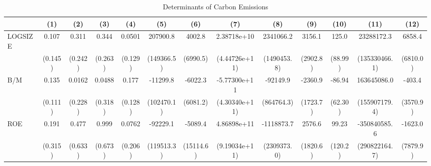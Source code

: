 \begin{table}[htbp]\centering
\def\sym#1{\ifmmode^{#1}\else\(^{#1}\)\fi}
\caption{Determinants of Carbon Emissions}
\begin{tabular}{l*{12}{c}}
\hline\hline
                    &\multicolumn{1}{c}{(1)}         &\multicolumn{1}{c}{(2)}         &\multicolumn{1}{c}{(3)}         &\multicolumn{1}{c}{(4)}         &\multicolumn{1}{c}{(5)}         &\multicolumn{1}{c}{(6)}         &\multicolumn{1}{c}{(7)}         &\multicolumn{1}{c}{(8)}         &\multicolumn{1}{c}{(9)}         &\multicolumn{1}{c}{(10)}         &\multicolumn{1}{c}{(11)}         &\multicolumn{1}{c}{(12)}         \\
\hline
LOGSIZE             &       0.107         &       0.311         &       0.344         &      0.0501         &    207900.8         &      4002.8         & 2.38718e+10         &   2341066.2         &      3156.1         &       125.0         &  23288172.3         &      6858.4         \\
                    &     (0.145)         &     (0.242)         &     (0.263)         &     (0.129)         &  (149366.5)         &    (6990.5)         &(4.44726e+11)         & (1490453.8)         &    (2902.8)         &     (88.99)         &(135330466.1)         &    (6810.0)         \\
B/M                 &       0.135         &      0.0162         &      0.0488         &       0.177         &    -11299.8         &     -6022.3         &-5.77300e+11         &    -92149.9         &     -2360.9         &      -86.94         & 163645086.0         &      -403.4         \\
                    &     (0.111)         &     (0.228)         &     (0.318)         &     (0.128)         &  (102470.1)         &    (6081.2)         &(4.30340e+11)         &  (864764.3)         &    (1723.7)         &     (62.30)         &(155907179.4)         &    (3570.9)         \\
ROE                 &       0.191         &       0.477         &       0.999         &      0.0762         &    -92229.1         &     -5089.4         & 4.86898e+11         &  -1118873.7         &      2576.6         &       99.23         &-350840585.6         &     -1623.0         \\
                    &     (0.315)         &     (0.633)         &     (0.673)         &     (0.206)         &  (119513.3)         &   (15114.6)         &(9.19034e+11)         & (2309373.0)         &    (1820.6)         &     (120.2)         &(290822164.7)         &    (7879.9)         \\

\end{tabular}
\end{table}
